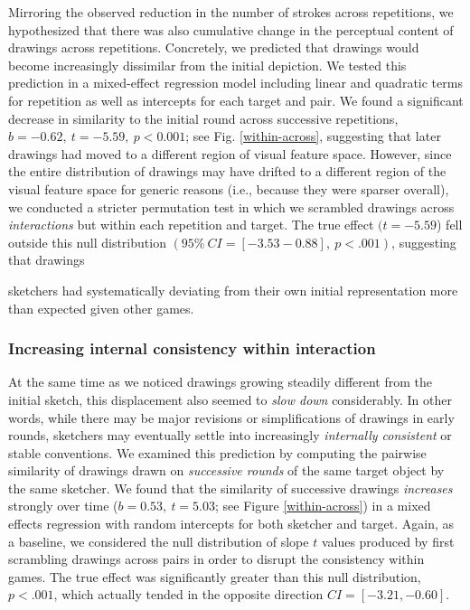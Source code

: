 \documentclass[10pt,letterpaper]{article}
\begin{document}
Mirroring the observed reduction in the number of strokes across repetitions, we hypothesized that there was also cumulative change in the perceptual content of drawings across repetitions. 
Concretely, we predicted that drawings would become increasingly dissimilar from the initial depiction. 
We tested this prediction in a mixed-effect regression model including linear and quadratic terms for repetition as well as intercepts for each target and pair.
We found a significant decrease in similarity to the initial round across successive repetitions, $b = -0.62,~t = -5.59, ~p < 0.001$; see Fig. \ref{within-across}, suggesting that later drawings had moved to a different region of visual feature space. 
However, since the entire distribution of drawings may have drifted to a different region of the visual feature space for generic reasons (i.e., because they were sparser overall), we conducted a stricter permutation test in which we scrambled drawings across \emph{interactions} but within each repetition and target.
The true effect $(t = -5.59$) fell outside this null distribution $(95\%~CI= [-3.53 -0.88], ~p < .001)$, suggesting that drawings 

sketchers had systematically deviating from their own initial representation more than expected given other games.

\subsubsection{Increasing internal consistency within interaction}

At the same time as we noticed drawings growing steadily different from the initial sketch, this displacement also seemed to \emph{slow down} considerably.
In other words, while there may be major revisions or simplifications of drawings in early rounds, sketchers may eventually settle into  increasingly \emph{internally consistent} or stable conventions.
We examined this prediction by computing the pairwise similarity of drawings drawn on \emph{successive rounds} of the same target object by the same sketcher.
We found that the similarity of successive drawings \emph{increases} strongly over time ($b = 0.53,~t = 5.03$; see Figure \ref{within-across}) in a mixed effects regression with random intercepts for both sketcher and target.
Again, as a baseline, we considered the null distribution of slope $t$ values produced by first scrambling drawings across pairs in order to disrupt the consistency within games.
The true effect was significantly greater than this null distribution, $p < .001$, which actually tended in the opposite direction $CI = [-3.21, -0.60]$.
\end{document}
